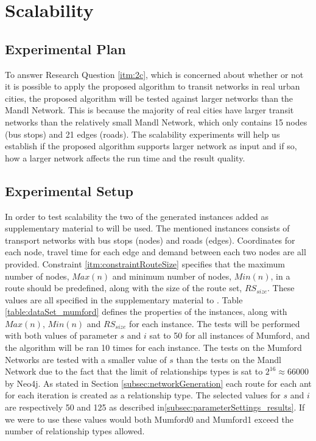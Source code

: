 \section{Scalability}

\subsection{Experimental Plan}
To answer Research Question \vref{itm:2c}, which is concerned about whether or not it is possible to apply the proposed algorithm to transit networks in real urban cities, the proposed algorithm will be tested against larger networks than the Mandl Network. This is because the majority of real cities have larger transit networks than the relatively small Mandl Network, which only contains 15 nodes (bus stops) and 21 edges (roads). The scalability experiments will help us establish if the proposed algorithm supports larger network as input and if so, how a larger network affects the run time and the result quality.


\subsection{Experimental Setup}
\label{subsec:scalabilityExperiments_setup}

In order to test scalability the two of the generated instances added as supplementary material to \citet{mumford13} will be used. The mentioned instances consists of transport networks with bus stops (nodes) and roads (edges). Coordinates for each node, travel time for each edge and demand between each two nodes are all provided. Constraint \vref{itm:constraintRouteSize} specifies that the maximum number of nodes, $Max(n)$ and minimum number of nodes, $Min(n)$, in a route should be predefined, along with the size of the route set, $RS_{size}$. These values are all specified in the supplementary material to \citet{mumford13}. Table \vref{table:dataSet_mumford} defines the properties of the instances, along with $Max(n)$, $Min(n)$ and $RS_{size}$ for each instance. The tests will be performed with both values of parameter $s$ and $i$ sat to 50 for all instances of Mumford, and the algorithm will be ran 10 times for each instance. The tests on the Mumford Networks are tested with a smaller value of $s$ than the tests on the Mandl Network due to the fact that the limit of relationships types is sat to $2^{16} \approx 66 000$ by Neo4j. As stated in Section \vref{subsec:networkGeneration} each route for each ant for each iteration is created as a relationship type. The selected values for $s$ and $i$ are respectively 50 and 125 as described in\vref{subsec:parameterSettings_results}. If we were to use these values would both Mumford0 and Mumford1 exceed the number of relationship types allowed.  

